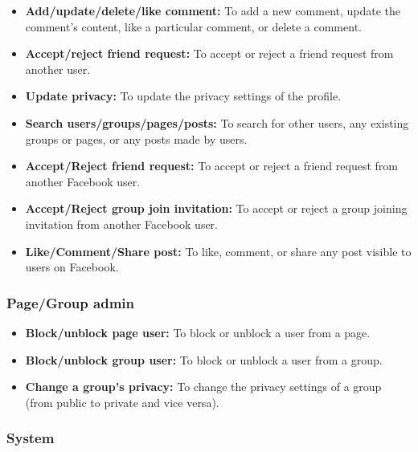 \begin{itemize}
\item
\protect{}\label{Vpeho-ghM7uk9x2Tu-8dx}
\textbf{Add/update/delete/like comment:} To add a new comment, update the comment's content, like a particular comment, or delete a comment.
\item
\protect{}\label{3-61Bx2roeRVUQWxABp3W}
\textbf{Accept/reject friend request:} To accept or reject a friend request from another user.
\item
\protect{}\label{T3Z-bGo2AP2bZwbYAPUpU}
\textbf{Update privacy:} To update the privacy settings of the profile.
\item
\protect{}\label{8J5gY6h4K13SGLUQAVG-0}
\textbf{Search users/groups/pages/posts:} To search for other users, any existing groups or pages, or any posts made by users.
\item
\protect{}\label{lp7FNRbMzWnvtz2rqsuHo}
\textbf{Accept/Reject friend request:} To accept or reject a friend request from another Facebook user.
\item
\protect{}\label{6cIu85rchJJptN0cLCK_P}
\textbf{Accept/Reject group join invitation:} To accept or reject a group joining invitation from another Facebook user.
\item
\protect{}\label{xL_JTxxHNDlZSMKumrOHJ}
\textbf{Like/Comment/Share post:} To like, comment, or share any post visible to users on Facebook.
\end{itemize}

\subsubsection{Page/Group admin}\label{90gxYT6p4TvDwt3jDunqj}

\begin{itemize}
\item
\protect{}\label{BQxbKGZrutf4eoBPhhH5o}
\textbf{Block/unblock page user:} To block or unblock a user from a page.
\item
\protect{}\label{BQxbKGZrutf4eoBPhhH5o}
\textbf{Block/unblock group user:} To block or unblock a user from a group.
\item
\protect{}\label{S2i2OpLii23Kt_IlOjvfB}
\textbf{Change a group's privacy:} To change the privacy settings of a group (from public to private and vice versa).
\end{itemize}

\subsubsection{System}\label{UHUCT51fVgCEXmtFp9oGP}

